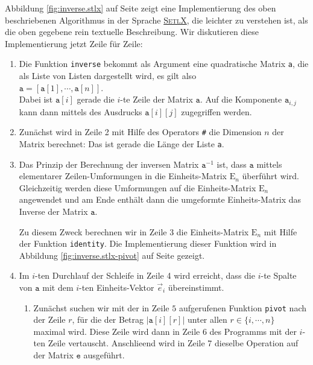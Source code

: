 Abbildung \ref{fig:inverse.stlx} auf Seite \pageref{fig:inverse.stlx} zeigt eine Implementierung des oben beschriebenen Algorithmus in
der Sprache \href{http://randoom.org/Software/SetlX}{\textsc{SetlX}}, 
die leichter zu verstehen ist, als die oben gegebene rein textuelle Beschreibung.  Wir diskutieren
diese Implementierung jetzt Zeile f\"{u}r Zeile:
\begin{enumerate}
\item Die Funktion \texttt{inverse} bekommt als Argument eine quadratische Matrix \texttt{a}, die 
      als Liste von Listen dargestellt wird, es gilt also
      \\[0.2cm]
      \hspace*{1.3cm}
      $\mathtt{a} = [\mathtt{a}[1], \cdots, \mathtt{a}[n]]$.
      \\[0.2cm]
      Dabei ist $\mathtt{a}[i]$ gerade die $i$-te Zeile der Matrix $\mathtt{a}$.  Auf die Komponente
      $\mathtt{a}_{i,j}$ kann dann mittels des Ausdrucks $\mathtt{a}[i][j]$ zugegriffen werden.
\item Zun\"{a}chst wird in Zeile 2 mit Hilfe des Operators \texttt{\#}
      die Dimension $n$ der Matrix berechnet: Das ist gerade die L\"{a}nge der
      Liste \texttt{a}.
\item Das Prinzip der Berechnung der inversen Matrix $\mathtt{a}^{-1}$ ist, dass $\mathtt{a}$
      mittels elementarer Zeilen-Umformungen in die Einheits-Matrix $\mathrm{E}_n$ \"{u}berf\"{u}hrt wird.
      Gleichzeitig werden diese Umformungen auf die Einheits-Matrix $\mathrm{E}_n$ angewendet
      und am Ende enth\"{a}lt dann die umgeformte Einheits-Matrix das Inverse der Matrix $\mathtt{a}$.
 
      Zu diesem Zweck berechnen wir in Zeile 3 die Einheits-Matrix $\mathrm{E}_n$ mit Hilfe der
      Funktion \texttt{identity}.  Die Implementierung dieser Funktion wird in Abbildung
      \ref{fig:inverse.stlx-pivot} auf Seite \pageref{fig:inverse.stlx-pivot} gezeigt.
\item Im $i$-ten Durchlauf der Schleife in Zeile 4 wird erreicht, dass die $i$-te Spalte von
      $\mathtt{a}$ mit dem $i$-ten Einheits-Vektor $\vec{e}_i$ \"{u}bereinstimmt.
      \begin{enumerate}
      \item Zun\"{a}chst suchen wir mit der in Zeile $5$ aufgerufenen Funktion \texttt{pivot}
            nach der Zeile $r$, f\"{u}r die der Betrag $|\mathtt{a}[i][r]|$ unter allen 
            $r \in \{i, \cdots,n \}$ maximal wird.  Diese Zeile wird dann in Zeile 6 des Programms mit der $i$-ten Zeile
            vertauscht.  Anschlie\3end wird in Zeile 7 dieselbe Operation auf der Matrix $\mathtt{e}$ ausgef\"{u}hrt.


\end{enumerate}
\end{enumerate}
